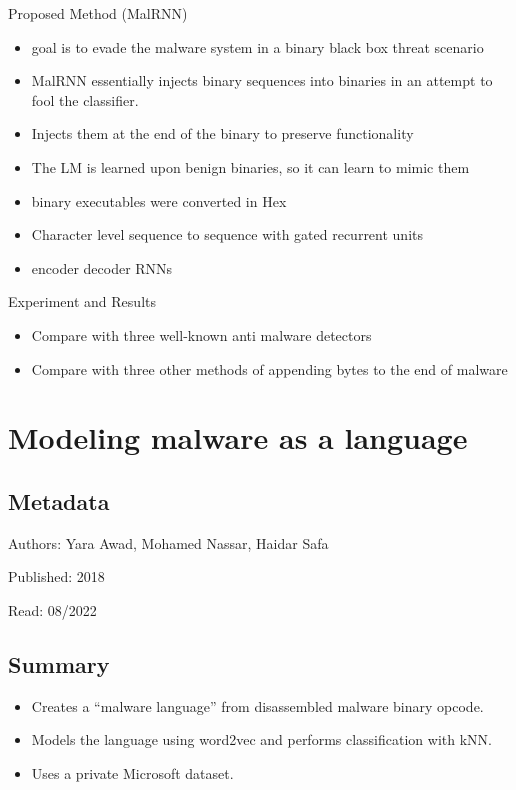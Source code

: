 \documentclass{article}
\begin{document}
Proposed Method (MalRNN)
\begin{itemize}
\item goal is to evade the malware system in a binary black box threat scenario
\item MalRNN essentially injects binary sequences into binaries in an attempt to fool the classifier. \item Injects them at the end of the binary to preserve functionality
\item The LM is learned upon benign binaries, so it can learn to mimic them
\item binary executables were converted in Hex
\item Character level sequence to sequence with gated recurrent units
\item encoder decoder RNNs
\end{itemize}
Experiment and Results
\begin{itemize}
\item Compare with three well-known anti malware detectors
\item Compare with three other methods of appending bytes to the end of malware
\end{itemize}

\pagebreak


\section*{Modeling malware as a language}

\subsection*{Metadata}

\noindent Authors: Yara Awad, Mohamed Nassar, Haidar Safa

\noindent Published: 2018

\noindent Read: 08/2022

\subsection*{Summary}
\begin{itemize}
\item Creates a ``malware language'' from disassembled malware binary opcode.
\item Models the language using word2vec and performs classification with kNN.
\item Uses a private Microsoft dataset.
\end{itemize}
\end{document}

